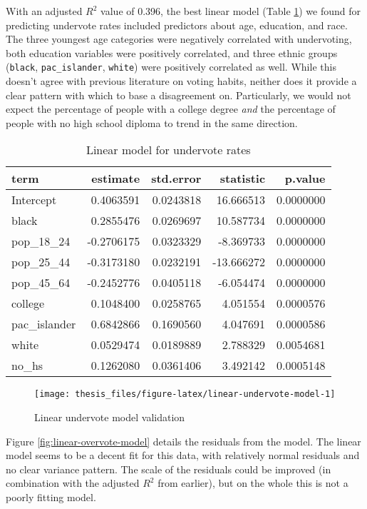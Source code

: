 \documentclass[12pt,twoside]{reedthesis}
\begin{document}
With an adjusted \(R^2\) value of 0.396, the best linear model (Table \ref{tab:linear-undervote-model}) we found for predicting undervote rates included predictors about age, education, and race. The three youngest age categories were negatively correlated with undervoting, both education variables were positively correlated, and three ethnic groups (\texttt{black}, \texttt{pac\_islander}, \texttt{white}) were positively correlated as well. While this doesn't agree with previous literature on voting habits, neither does it provide a clear pattern with which to base a disagreement on. Particularly, we would not expect the percentage of people with a college degree \emph{and} the percentage of people with no high school diploma to trend in the same direction.
\begin{table}[t]

\caption[Linear undervote model]{\label{tab:linear-undervote-model}Linear model for undervote rates}
\centering
\begin{tabular}{lrrrr}
\toprule
term & estimate & std.error & statistic & p.value\\
\midrule
Intercept & 0.4063591 & 0.0243818 & 16.666513 & 0.0000000\\
black & 0.2855476 & 0.0269697 & 10.587734 & 0.0000000\\
pop\_18\_24 & -0.2706175 & 0.0323329 & -8.369733 & 0.0000000\\
pop\_25\_44 & -0.3173180 & 0.0232191 & -13.666272 & 0.0000000\\
pop\_45\_64 & -0.2452776 & 0.0405118 & -6.054474 & 0.0000000\\
\addlinespace
college & 0.1048400 & 0.0258765 & 4.051554 & 0.0000576\\
pac\_islander & 0.6842866 & 0.1690560 & 4.047691 & 0.0000586\\
white & 0.0529474 & 0.0189889 & 2.788329 & 0.0054681\\
no\_hs & 0.1262080 & 0.0361406 & 3.492142 & 0.0005148\\
\bottomrule
\end{tabular}
\end{table}
\begin{figure}
\texttt{[image: thesis\_files/figure-latex/linear-undervote-model-1]} \caption{Linear undervote model validation}\label{fig:linear-undervote-model}
\end{figure}
Figure \ref{fig:linear-overvote-model} details the residuals from the model. The linear model seems to be a decent fit for this data, with relatively normal residuals and no clear variance pattern. The scale of the residuals could be improved (in combination with the adjusted \(R^2\) from earlier), but on the whole this is not a poorly fitting model.
\end{document}
